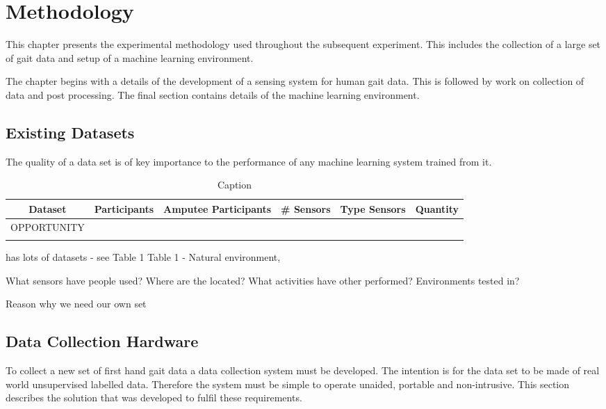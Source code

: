 \chapter{Methodology}
\label{chp:methods}
This chapter presents the experimental methodology used throughout the subsequent experiment. This includes the collection of a large set of gait data and setup of a machine learning environment.

The chapter begins with a details of the development of a sensing system for human gait data. This is followed by work on collection of data and post processing. The final section contains details of the machine learning environment.

\section{Existing Datasets} %
The quality of a data set is of key importance to the performance of any machine learning system trained from it.

\begin{table}[hbt]
    \centering
    \begin{tabularx}{\textwidth}{cYYYYY}
        Dataset & Participants & Amputee Participants & \# Sensors & Type Sensors & Quantity \\ %
        \hline
        OPPORTUNITY\cite{} & \\
         \\
    \end{tabularx}
    \caption{Caption}
    \label{tab:my_label}
\end{table}

\cite{Cruciani2020} has lots of datasets - see Table 1
\cite{Micucci2017} Table 1
\cite{Vaizman2017} - Natural environment,
\cite{Garcia-Gonzalez2020}

\cite{Fu2021}

What sensors have people used? Where are the located? What activities have other performed? Environments tested in?

Reason why we need our own set


\section{Data Collection Hardware}
To collect a new set of first hand gait data a data collection system must be developed. The intention is for the data set to be made of real world unsupervised labelled data. Therefore the system must be simple to operate unaided, portable and non-intrusive. This section describes the solution that was developed to fulfil these requirements.


